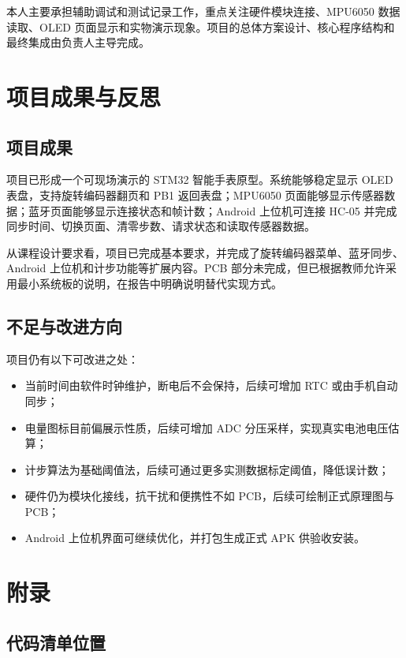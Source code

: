 \documentclass[UTF8,fontset=windows,12pt,a4paper]{ctexart}
\begin{document}
本人主要承担辅助调试和测试记录工作，重点关注硬件模块连接、MPU6050 数据读取、OLED 页面显示和实物演示现象。项目的总体方案设计、核心程序结构和最终集成由负责人主导完成。

\section{项目成果与反思}

\subsection{项目成果}

项目已形成一个可现场演示的 STM32 智能手表原型。系统能够稳定显示 OLED 表盘，支持旋转编码器翻页和 PB1 返回表盘；MPU6050 页面能够显示传感器数据；蓝牙页面能够显示连接状态和帧计数；Android 上位机可连接 HC-05 并完成同步时间、切换页面、清零步数、请求状态和读取传感器数据。

从课程设计要求看，项目已完成基本要求，并完成了旋转编码器菜单、蓝牙同步、Android 上位机和计步功能等扩展内容。PCB 部分未完成，但已根据教师允许采用最小系统板的说明，在报告中明确说明替代实现方式。

\subsection{不足与改进方向}

项目仍有以下可改进之处：
\begin{itemize}[leftmargin=2em]
  \item 当前时间由软件时钟维护，断电后不会保持，后续可增加 RTC 或由手机自动同步；
  \item 电量图标目前偏展示性质，后续可增加 ADC 分压采样，实现真实电池电压估算；
  \item 计步算法为基础阈值法，后续可通过更多实测数据标定阈值，降低误计数；
  \item 硬件仍为模块化接线，抗干扰和便携性不如 PCB，后续可绘制正式原理图与 PCB；
  \item Android 上位机界面可继续优化，并打包生成正式 APK 供验收安装。
\end{itemize}

\section{附录}

\subsection{代码清单位置}
\end{document}
